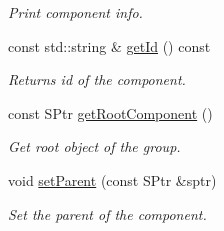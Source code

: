 \begin{DoxyCompactItemize}
\begin{DoxyCompactList}\small\item\em Print component info. \end{DoxyCompactList}\item 
const std\+::string \& \hyperlink{classAlarmComponent_a7d576b833767677aef88ac0e53dc5f22}{get\+Id} () const \hypertarget{classAlarmComponent_a7d576b833767677aef88ac0e53dc5f22}{}\label{classAlarmComponent_a7d576b833767677aef88ac0e53dc5f22}

\begin{DoxyCompactList}\small\item\em Returns id of the component. \end{DoxyCompactList}\item 
const S\+Ptr \hyperlink{classAlarmComponent_ab105241dfaade407b9683bb32e8d0f2f}{get\+Root\+Component} ()
\begin{DoxyCompactList}\small\item\em Get root object of the group. \end{DoxyCompactList}\item 
void \hyperlink{classAlarmComponent_a8a23397273077d5808735d083878378a}{set\+Parent} (const S\+Ptr \&sptr)
\begin{DoxyCompactList}\small\item\em Set the parent of the component. \end{DoxyCompactList}\end{DoxyCompactItemize}
